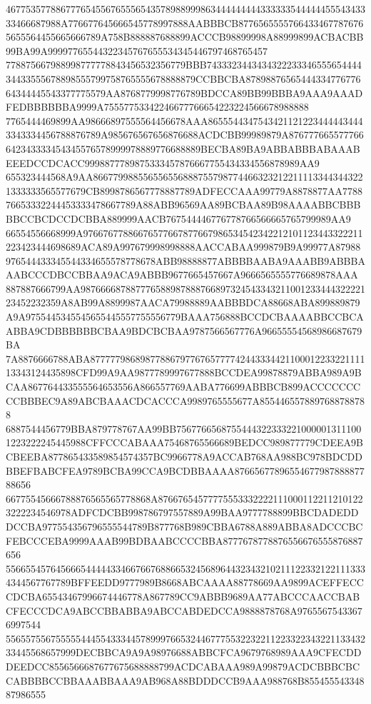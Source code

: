46775357788677765455676555654357898899986344444444433333354444445554343333466687988A776677645666545778997888AABBBCB87765655557664334677876765655564455665666789A758B888887688899ACCCB98899998A88999899ACBACBB99BA99A99997765544322345767655534345446797468765457
778875667988998777778843456532356779BBB743332344343432223334655565444434433555678898555799758765555678888879CCBBCBA8789887656544433477677664344445543377775579AA8768779998776789BDCCA89BB99BBBA9AAA9AAADFEDBBBBBBA9999A75557753342246677766654223224566678988888
7765444469899AA98666897555564456678AAA86555443475434211212234444434443343334456788876789A985676567656876688ACDCBB99989879A876777665577766642343333454345576578999978889776688889BECBA89BA9ABBABBBABAAABEEEDCCDCACC9998877789875333457876667755434334556878989AA9
655323444568A9AA8667799885565565568887557987744663232122111133443443221333333565577679CB8998786567778887789ADFECCAAA99779A8878877AA778876653332244453333478667789A88ABB96569AA89BCBAA89B98AAAABBCBBBBBCCBCDCCDCBBA889999AACB767544446776778766566665765799989AA9
66554556668999A97667677886676577667877667986534542342212101123443322211223423444698689ACA89A997679998998888AACCABAA999879B9A99977A87988976544433345544334655578778678ABB98888877ABBBBAABA9AAABB9ABBBAAABCCCDBCCBBAA9ACA9ABBB9677665457667A9666565555776689878AAA
887887666799AA98766668788777658898788876689732454334321100123344432222123452232359A8AB99A8899987AACA79988889AABBBDCA88668ABA899889879A9A9755445345545655445557755556779BAAA756888BCCDCBAAAABBCCBCAABBA9CDBBBBBBCBAA9BDCBCBAA9787566567776A96655554568986687679BA
7A8876666788ABA877777986898778867977676577774244333442110001223322111113343124435898CFD99A9AA9877789997677888BCCDEA99878879ABBA989A9BCAA867764433555564653556A866557769AABA776699ABBBCB899ACCCCCCCCCBBBEC9A89ABCBAAACDCACCCA9989765555677A8554465578897688788788
6887544456779BBA879778767AA99BB75677665687554443223332210000013111001223222245445988CFFCCCABAAA75468765566689BEDCC989877779CDEEA9BCBEEBA877865433589854574357BC9966778A9ACCAB768AA988BC978BDCDDBBEFBABCFEA9789BCBA99CCA9BCDBBAAAA8766567789655467798788887788656
66775545666788876565565778868A876676545777755533322221110001122112101223222234546978ADFCDCBB998786797557889A99BAA9777788899BBCDADEDDDCCBA977554356796555544789B877768B989CBBA6788A889ABBA8ADCCCBCFEBCCCEBA9999AAAB99BDBAABCCCCBBA8777678778876556676555876887656
5566554576456665444443346676676886653245689644323432102111223321221113334344567767789BFFEEDD9777989B8668ABCAAAA88778669AA9899ACEFFECCCDCBA65543467996674446778A867789CC9ABBB9689AA77ABCCCAACCBABCFECCCDCA9ABCCBBABBA9ABCCABDEDCCA9888878768A97655675433676997544
55655755675555544455433344578999766532446777553223221122332234322113343233445568657999DECBBCA9A9A98976688ABBCFCA9679768989AAA9CFECDDDEEDCC8556566687677675688888799ACDCABAAA989A99879ACDCBBBCBCCABBBBCCBBAAABBAAA9AB968A88BDDDCCB9AAA988768B85545554334887986555
